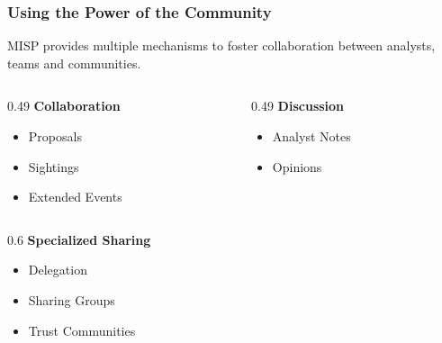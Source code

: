 \begin{frame}
    \frametitle{Using the Power of the Community}

    MISP provides multiple mechanisms to foster collaboration between analysts, teams and communities.


    \begin{center}

        \begin{columns}[T]

            \begin{column}{0.49\textwidth}
                \card{\linewidth}{2.5em}
                    {{\Large\faUsers}\hspace{0.3em}\textbf{Collaboration}}
                    {
                        \begin{itemize}
                            \item Proposals
                            \item Sightings
                            \item Extended Events
                        \end{itemize}
                    }
            \end{column}

            \begin{column}{0.49\textwidth}
                \card{\linewidth}{2.5em}
                    {{\Large\faComments}\hspace{0.3em}\textbf{Discussion}}
                    {
                        \begin{itemize}
                            \item Analyst Notes
                            \item Opinions
                        \end{itemize}
                    }
            \end{column}

        \end{columns}

        \vspace{-0.5em}
        \centering
        \begin{columns}[T]

            \begin{column}{0.6\textwidth}
                {{\Large\faGlobe}\hspace{0.3em}\textbf{Specialized Sharing}}
                {
                    \begin{itemize}
                        \item Delegation
                        \item Sharing Groups
                        \item Trust Communities
                    \end{itemize}
                }
                \end{column}


\end{columns}
\end{center}
\end{frame}
